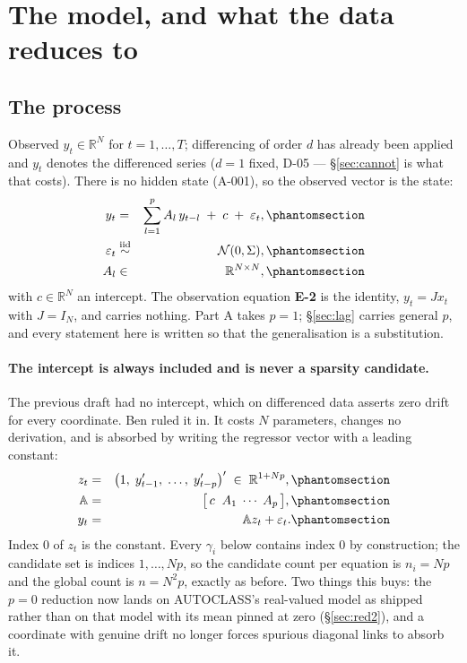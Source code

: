 
\section{The model, and what the data reduces to}\label{sec:model}

\subsection{The process}

Observed $y_t\in\mathbb{R}^N$ for $t=1,\dots,T$; differencing of order $d$ has
already been applied and $y_t$ denotes the differenced series ($d=1$ fixed, D-05 ---
\S\ref{sec:cannot} is what that costs). There is no hidden state (A-001), so the
observed vector is the state:
\begin{eqnarray}
y_t &=& \sum_{l=1}^{p} A_l\, y_{t-l} \;+\; c \;+\; \varepsilon_t,
  \Elabel{E-1A}{E1_A} \\
\varepsilon_t &\overset{\text{iid}}{\sim}& \mathcal{N}(0,\Sigma),
  \Elabel{E-1B}{E1_B} \\
A_l &\in& \mathbb{R}^{N\times N},
  \Elabel{E-1C}{E1_C}
\end{eqnarray}
with $c\in\mathbb{R}^N$ an intercept. The observation equation \textbf{E-2} is the
identity, $y_t=Jx_t$ with $J=I_N$, and carries nothing. Part A takes $p=1$;
\S\ref{sec:lag} carries general $p$, and every statement here is written so that the
generalisation is a substitution.

\paragraph{The intercept is always included and is never a sparsity candidate.} The
previous draft had no intercept, which on differenced data asserts zero drift for
every coordinate. Ben ruled it in. It costs $N$ parameters, changes no derivation,
and is absorbed by writing the regressor vector with a leading constant:
\begin{eqnarray}
z_t &=& \bigl(1,\; y_{t-1}',\; \dots,\; y_{t-p}'\bigr)' \;\in\; \mathbb{R}^{1+Np},
  \Elabel{E-134A}{E134_A} \\
\bbA &=& \bigl[\, c \;\; A_1 \;\cdots\; A_p \,\bigr],
  \Elabel{E-134B}{E134_B} \\
y_t &=& \bbA z_t + \varepsilon_t.
  \Elabel{E-134C}{E134_C}
\end{eqnarray}
Index 0 of $z_t$ is the constant. Every $\gamma_i$ below contains index 0 by
construction; the candidate set is indices $1,\dots,Np$, so the candidate count per
equation is $n_i=Np$ and the global count is $n=N^2p$, exactly as before. Two things
this buys: the $p=0$ reduction now lands on AUTOCLASS's real-valued model as shipped
rather than on that model with its mean pinned at zero (\S\ref{sec:red2}), and a
coordinate with genuine drift no longer forces spurious diagonal links to absorb it.

